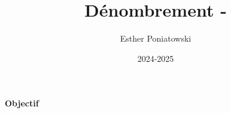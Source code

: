 \documentclass[10pt,a4paper]{article}
\title{Dénombrement - }
\author{Esther Poniatowski}
\date{2024-2025}
\begin{document}
\textbf{Objectif}
\end{document}
